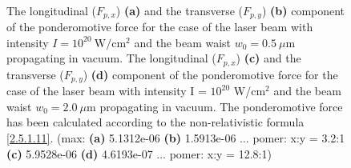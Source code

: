 \begin{figure}[h!]
	\centering
	\\
	\caption{The longitudinal ($ F_{p, x} $) \textbf{(a)} and the transverse ($ F_{p, y} $) \textbf{(b)} component of the ponderomotive force for the case of the laser beam with intensity $ I = 10^{20} \ \mathrm{W/cm^2} $ and the beam waist $ w_0 = 0.5 \ \mu\mathrm{m} $ propagating in vacuum. The longitudinal ($ F_{p, x} $) \textbf{(c)} and the transverse ($ F_{p, y} $) \textbf{(d)} component of the ponderomotive force for the case of the laser beam with intensity I = $ 10^{20} $ W/cm$^2$ and the beam waist $ w_0 = 2.0 \ \mu\mathrm{m} $ propagating in vacuum. The ponderomotive force has been calculated according to the non-relativistic formula \ref{2.5.1.11}. (max: \textbf{(a)} 5.1312e-06 \textbf{(b)} 1.5913e-06 ... pomer: x:y = 3.2:1 \textbf{(c)} 5.9528e-06 \textbf{(d)} 4.6193e-07 ... pomer: x:y = 12.8:1)}

\end{figure}
